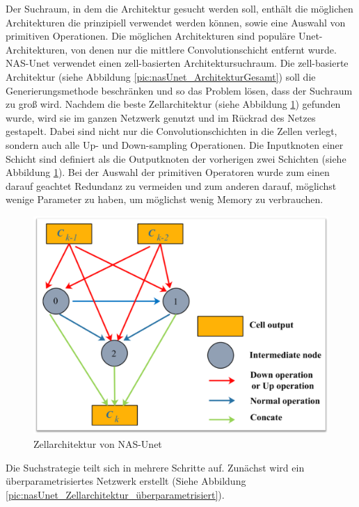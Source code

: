 Der Suchraum, in dem die Architektur gesucht werden soll, enthält die möglichen Architekturen die prinzipiell verwendet werden können, sowie eine Auswahl von primitiven Operationen. Die möglichen Architekturen sind populäre Unet-Architekturen, von denen nur die mittlere Convolutionschicht entfernt wurde. 
NAS-Unet verwendet einen zell-basierten Architektursuchraum. Die zell-basierte Architektur (siehe Abbildung \ref{pic:nasUnet_ArchitekturGesamt}) soll die Generierungsmethode beschränken und so das Problem lösen, dass der Suchraum zu groß wird. Nachdem die beste Zellarchitektur (siehe Abbildung \ref{pic:nasUnet_Zellarchitektur}) gefunden wurde, wird sie im ganzen Netzwerk genutzt und im Rückrad des Netzes gestapelt. Dabei sind nicht nur die Convolutionschichten in die Zellen verlegt, sondern auch alle Up- und Down-sampling Operationen. Die Inputknoten einer Schicht sind definiert als die Outputknoten der vorherigen zwei Schichten (siehe Abbildung \ref{pic:nasUnet_Zellarchitektur}). 
Bei der Auswahl der primitiven Operatoren wurde zum einen darauf geachtet Redundanz zu vermeiden und zum anderen darauf, möglichst wenige Parameter zu haben, um möglichst wenig Memory zu verbrauchen. 

\begin{figure}[H]
	
	\centering
	\includegraphics[scale=0.30]{Pictures/nasUnet/Bild2.png}
	\caption{Zellarchitektur von NAS-Unet \cite{nasunetPaper} }
	\label{pic:nasUnet_Zellarchitektur}
\end{figure}

Die Suchstrategie teilt sich in mehrere Schritte auf. Zunächst wird ein überparametrisiertes Netzwerk erstellt (Siehe Abbildung \ref{pic:nasUnet_Zellarchitektur_überparametrisiert}).

